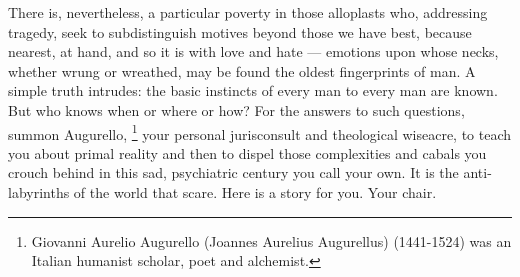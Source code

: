   There is, nevertheless, a particular poverty in those alloplasts 
who, addressing tragedy, seek to subdistinguish motives beyond those we have best,
because nearest, at hand, and so it is with love and hate --- emotions upon
whose necks, whether wrung
or wreathed,
may be found the oldest fingerprints of man. A simple truth intrudes: the basic 
instincts of every man to every man are known.
But who knows when or where or how? For the answers to such questions, summon
Augurello, 
\footnote{Giovanni Aurelio Augurello (Joannes Aurelius Augurellus) (1441-1524)
was an Italian humanist scholar, poet and alchemist.}
your personal jurisconsult
and theological wiseacre,
to teach you about primal reality and then to dispel those complexities and cabals 
you crouch behind in this sad, psychiatric century you call your own. It is the
anti-labyrinths of the world that scare. Here is a story for you. Your chair.

\vspace{0.4cm}

